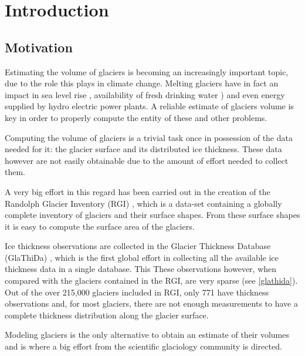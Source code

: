\chapter{Introduction}\label{chap1}
\thispagestyle{plain}

\section{Motivation}\label{motivation}
Estimating the volume of glaciers is becoming an increasingly important topic, due to the role this plays in climate change. Melting glaciers have in fact an impact in sea level rise \citep{Zemp2017}, availability of fresh drinking water \citep{Kaser2010}) and even energy supplied by hydro electric power plants\citep{Terrier2011}. A reliable estimate of glaciers volume is key in order to properly compute the entity of these and other problems.

Computing the volume of glaciers is a trivial task once in possession of the data needed for it: the glacier surface and its distributed ice thickness. These data however are not easily obtainable due to the amount of effort needed to collect them.

A very big effort in this regard has been carried out in the creation of the Randolph Glacier Inventory (RGI) \citep{RGI2014}, which is a data-set containing a globally complete inventory of glaciers and their surface shapes. From these surface shapes it is easy to compute the surface area of the glaciers.

Ice thickness observations are collected in the Glacier Thickness Database (GlaThiDa) \citep{GlaThiDa2014}, which is the first global effort in collecting all the available ice thickness data in a single database. This These observations however, when compared with the glaciers contained in the RGI, are very sparse (see \ref{glathida}). Out of the over 215,000 glaciers included in RGI, only 771 have thickness observations and, for most glaciers, there are not enough measurements to have a complete thickness distribution along the glacier surface. 

Modeling glaciers is the only alternative to obtain an estimate of their volumes and is where a big effort from the scientific glaciology community is directed.
  



